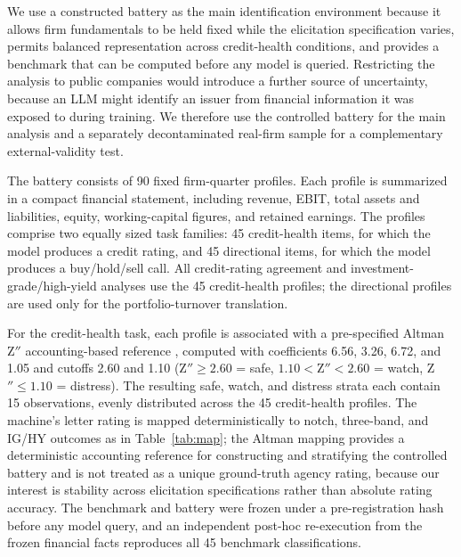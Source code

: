 \documentclass[a4paper,fleqn]{cas-sc}
\begin{document}
We use a constructed battery as the main identification environment because it allows firm fundamentals
to be held fixed while the elicitation specification varies, permits balanced representation across
credit-health conditions, and provides a benchmark that can be computed before any model is queried.
Restricting the analysis to public companies would introduce a further source of uncertainty,
because an LLM might identify an issuer from financial information it was exposed to during training. We
therefore use the controlled battery for the main analysis and a separately decontaminated real-firm
sample for a complementary external-validity test.

The battery consists of 90 fixed firm-quarter profiles. Each profile is summarized in a compact financial
statement, including revenue, EBIT, total assets and liabilities, equity, working-capital figures, and
retained earnings. The profiles comprise two equally sized task families: 45 credit-health items, for
which the model produces a credit rating, and 45 directional items, for which the model produces a
buy/hold/sell call. All credit-rating agreement and investment-grade/high-yield analyses use the 45
credit-health profiles; the directional profiles are used only for the portfolio-turnover translation.

For the credit-health task, each profile is associated with a pre-specified Altman Z$''$ accounting-based
reference \citep{altman1968}, computed with coefficients 6.56, 3.26, 6.72, and 1.05 and cutoffs 2.60 and
1.10 (Z$''\ge2.60$ = safe, $1.10<{}$Z$''<2.60$ = watch, Z$''\le1.10$ = distress). The resulting safe,
watch, and distress strata each contain 15 observations, evenly distributed across the 45 credit-health
profiles. The machine's letter rating is mapped deterministically to notch, three-band, and IG/HY
outcomes as in Table~\ref{tab:map}; the Altman mapping provides a deterministic accounting reference for
constructing and stratifying the controlled battery and is not treated as a unique ground-truth agency
rating, because our interest is stability across elicitation specifications rather than absolute rating
accuracy. The benchmark and battery were frozen under a pre-registration hash before any model query, and
an independent post-hoc re-execution from the frozen financial facts reproduces all 45 benchmark
classifications.
\end{document}
